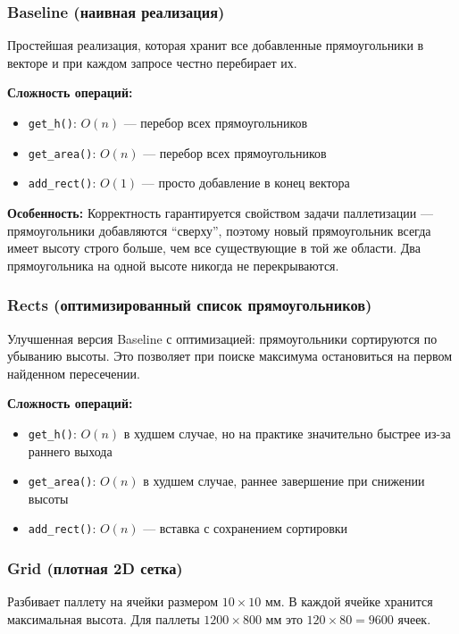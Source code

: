 \subsubsection{Baseline (наивная реализация)}

Простейшая реализация, которая хранит все добавленные прямоугольники в векторе и при каждом запросе честно перебирает их.

\textbf{Сложность операций:}
\begin{itemize}
    \item \texttt{get\_h()}: $O(n)$ --- перебор всех прямоугольников
    \item \texttt{get\_area()}: $O(n)$ --- перебор всех прямоугольников
    \item \texttt{add\_rect()}: $O(1)$ --- просто добавление в конец вектора
\end{itemize}

\textbf{Особенность:} Корректность гарантируется свойством задачи паллетизации --- прямоугольники добавляются ``сверху'', поэтому новый прямоугольник всегда имеет высоту строго больше, чем все существующие в той же области. Два прямоугольника на одной высоте никогда не перекрываются.

\subsubsection{Rects (оптимизированный список прямоугольников)}

Улучшенная версия Baseline с оптимизацией: прямоугольники сортируются по убыванию высоты. Это позволяет при поиске максимума остановиться на первом найденном пересечении.

\textbf{Сложность операций:}
\begin{itemize}
    \item \texttt{get\_h()}: $O(n)$ в худшем случае, но на практике значительно быстрее из-за раннего выхода
    \item \texttt{get\_area()}: $O(n)$ в худшем случае, раннее завершение при снижении высоты
    \item \texttt{add\_rect()}: $O(n)$ --- вставка с сохранением сортировки
\end{itemize}

\subsubsection{Grid (плотная 2D сетка)}

Разбивает паллету на ячейки размером $10 \times 10$ мм. В каждой ячейке хранится максимальная высота. Для паллеты $1200 \times 800$ мм это $120 \times 80 = 9600$ ячеек.

